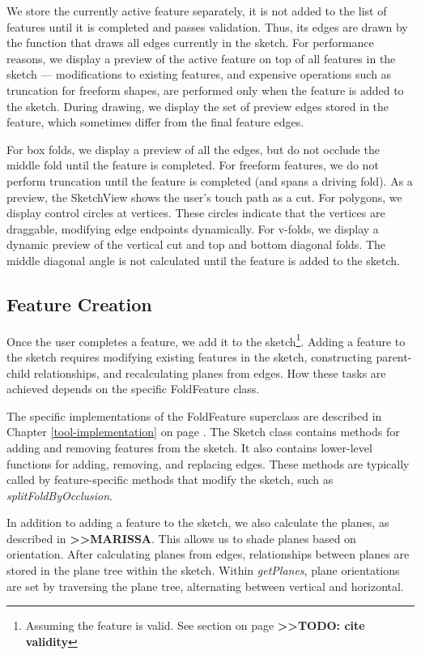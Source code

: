 We store the currently active feature separately, it is not added to the
list of features until it is completed and passes validation. Thus, its
edges are drawn by the function that draws all edges currently in the
sketch. For performance reasons, we display a preview of the active
feature on top of all features in the sketch --- modifications to
existing features, and expensive operations such as truncation for
freeform shapes, are performed only when the feature is added to the
sketch. During drawing, we display the set of preview edges stored in
the feature, which sometimes differ from the final feature edges.

For box folds, we display a preview of all the edges, but do not occlude
the middle fold until the feature is completed. For freeform features,
we do not perform truncation until the feature is completed (and spans a
driving fold). As a preview, the SketchView shows the user's touch path
as a cut. For polygons, we display control circles at vertices. These
circles indicate that the vertices are draggable, modifying edge
endpoints dynamically. For v-folds, we display a dynamic preview of the
vertical cut and top and bottom diagonal folds. The middle diagonal
angle is not calculated until the feature is added to the sketch.

\subsection{Feature Creation}\label{feature-creation}

Once the user completes a feature, we add it to the sketch\footnote{Assuming
  the feature is valid. See section on page
  \textbf{\textgreater{}\textgreater{}TODO: cite validity}}. Adding a
feature to the sketch requires modifying existing features in the
sketch, constructing parent-child relationships, and recalculating
planes from edges. How these tasks are achieved depends on the specific
FoldFeature class.

The specific implementations of the FoldFeature superclass are described
in Chapter \ref{tool-implementation} on page
\pageref{tool-implementation}. The Sketch class contains methods for
adding and removing features from the sketch. It also contains
lower-level functions for adding, removing, and replacing edges. These
methods are typically called by feature-specific methods that modify the
sketch, such as \emph{splitFoldByOcclusion}.

In addition to adding a feature to the sketch, we also calculate the
planes, as described in \textbf{\textgreater{}\textgreater{}MARISSA}.
This allows us to shade planes based on orientation. After calculating
planes from edges, relationships between planes are stored in the plane
tree within the sketch. Within \emph{getPlanes}, plane orientations are
set by traversing the plane tree, alternating between vertical and
horizontal.
